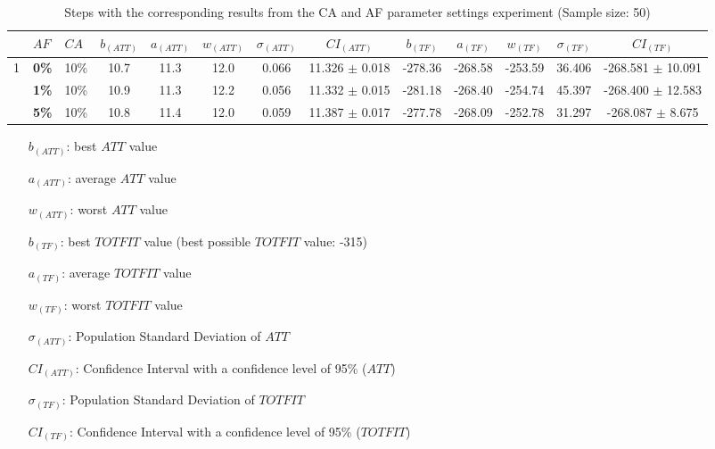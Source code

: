 \begin{sidewaystable}
    \hspace*{-0.5cm}
    \begin{tabular}{|l|l|l||c|c|c|c|c|c|c|c|c|c|}
    \hline
    ~ & $AF$ & $CA$ & $b_{(ATT)}$ & $a_{(ATT)}$ & $w_{(ATT)}$ & $\sigma_{(ATT)}$ & $CI_{(ATT)}$ & $b_{(TF)}$ & $a_{(TF)}$ & $w_{(TF)}$ & $\sigma_{(TF)}$ & $CI_{(TF)}$\\
    \hline
    1 & \textbf{0\%} & 10\% & 10.7 & 11.3 & 12.0 & 0.066 & 11.326 $\pm$ 0.018 & -278.36 & -268.58 & -253.59 & 36.406 & -268.581 $\pm$ 10.091 \\
    ~ & \textbf{1\%} & 10\% & 10.9 & 11.3 & 12.2 & 0.056 & 11.332 $\pm$ 0.015 & -281.18 & -268.40 & -254.74 & 45.397 & -268.400 $\pm$ 12.583 \\
    ~ & \textbf{5\%} & 10\% & 10.8 & 11.4 & 12.0 & 0.059 & 11.387 $\pm$ 0.017 & -277.78 & -268.09 & -252.78 & 31.297 & -268.087 $\pm$ 8.675 \\ 
    \hline
    
    \end{tabular}
    \caption {Steps with the corresponding results from the CA and AF parameter settings experiment (Sample size: 50)}
    \tiny
    \begin{itemize}[noitemsep]
    \item[$b_{(ATT)}$:] best $ATT$ value
    \item[$a_{(ATT)}$:] average $ATT$ value
    \item[$w_{(ATT)}$:] worst $ATT$ value
    \item[$b_{(TF)}$:] best $TOTFIT$ value (best possible $TOTFIT$ value: -315)
    \item[$a_{(TF)}$:] average $TOTFIT$ value
    \item[$w_{(TF)}$:] worst $TOTFIT$ value
    \item[$\sigma_{(ATT)}$:] Population Standard Deviation of $ATT$
    \item[$CI_{(ATT)}$:] Confidence Interval with a confidence level of 95\% ($ATT$)
    \item[$\sigma_{(TF)}$:] Population Standard Deviation of $TOTFIT$
    \item[$CI_{(TF)}$:] Confidence Interval with a confidence level of 95\% ($TOTFIT$)
    \end{itemize}
    \label{table:pm2}
\end{sidewaystable}



